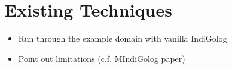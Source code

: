 \chapter{Existing Techniques}\label{ch:golog} %


\begin{itemize}
\item Run through the example domain with vanilla IndiGolog 
\item Point out limitations (c.f. MIndiGolog paper) 
\end{itemize}

